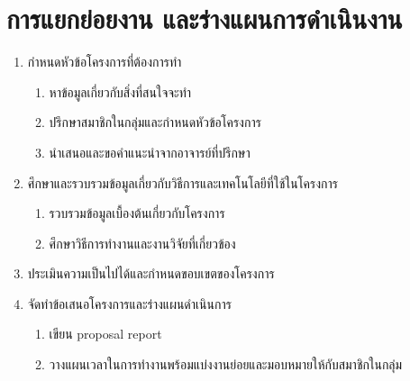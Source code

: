 \documentclass[12pt,oneside,openright,a4paper]{cpe-thai-project}
\begin{document}
\section{การแยกย่อยงาน และร่างแผนการดำเนินงาน}
\renewcommand{\labelenumii}{\arabic{enumii}}
\begin{enumerate}
  \item กำหนดหัวข้อโครงการที่ต้องการทำ
  \begin{enumerate}
    \item หาข้อมูลเกี่ยวกับสิ่งที่สนใจจะทำ
    \item ปรึกษาสมาชิกในกลุ่มและกำหนดหัวข้อโครงการ
    \item นำเสนอและขอคำแนะนำจากอาจารย์ที่ปรึกษา
  \end{enumerate} 
  \item ศึกษาและรวบรวมข้อมูลเกี่ยวกับวิธีการและเทคโนโลยีที่ใช้ในโครงการ
  \begin{enumerate}
    \item รวบรวมข้อมูลเบื้องต้นเกี่ยวกับโครงการ
    \item ศึกษาวิธีการทำงานและงานวิจัยที่เกี่ยวข้อง
  \end{enumerate}
  \item ประเมินความเป็นไปได้และกำหนดขอบเขตของโครงการ
  \item จัดทำข้อเสนอโครงการและร่างแผนดำเนินการ
  \begin{enumerate}
    \item เขียน proposal report
    \item วางแผนเวลาในการทำงานพร้อมแบ่งงานย่อยและมอบหมายให้กับสมาชิกในกลุ่ม
  \end{enumerate}

  \newpage


\end{enumerate}
\end{document}
